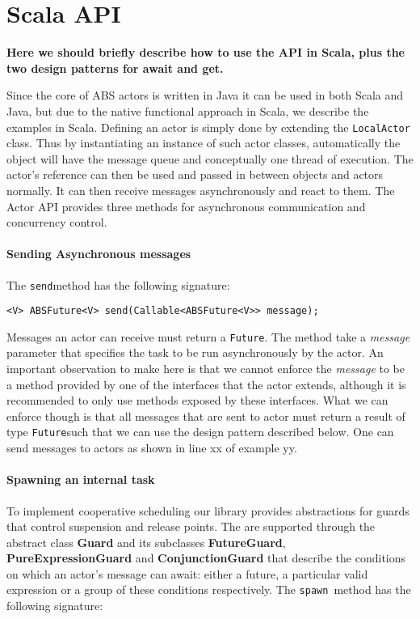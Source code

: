 \section{Scala API}
\label{scalaapi}

\newcommand{\future}{\lstinline{Future}}
\newcommand{\send}{\lstinline{send}}
\newcommand{\spawn}{\lstinline{spawn}}
\newcommand{\gspawn}{\lstinline{getSpawn}}


{\bf Here we should briefly describe how to use the API in Scala, plus the two design patterns for await and get.}

Since the core of ABS actors is written in Java it can be used in both Scala and Java, but due to the native functional approach in Scala, we describe the examples in Scala.
Defining an actor is simply done by extending the \lstinline{LocalActor} class. Thus by instantiating an instance of such actor classes, automatically the object will have the message queue and conceptually one thread of execution. The actor's reference can then be used and passed in between objects and actors normally. It can then receive messages asynchronously and react to them.  
The Actor API provides three methods for asynchronous communication and concurrency control.

\paragraph{Sending Asynchronous messages}
 The \send  method has the following signature:
\begin{lstlisting}
<V> ABSFuture<V> send(Callable<ABSFuture<V>> message);
\end{lstlisting}
Messages an actor can receive must return a \future. The method take a \textit{message} parameter that specifies the task to be run asynchronously by the actor. An important observation to make here is that we cannot enforce the \textit{message} to be a method provided by one of the interfaces that the actor extends, although it is recommended to only use methods exposed by these interfaces. What we can enforce though is that all messages that are sent to actor must return a result of type \future such that we can use the design pattern described below. 
One can send messages to actors as shown in line xx of example yy.



\paragraph{Spawning an internal task}
To implement cooperative scheduling our library provides abstractions for guards that control suspension and release points. The are supported through the abstract class \textbf{Guard} and its subclasses \textbf{FutureGuard}, \textbf{PureExpressionGuard} and \textbf{ConjunctionGuard} that describe the conditions on which an actor's message can await: either a future, a particular valid expression or a group of these conditions respectively. The \spawn ~method has the following signature:

